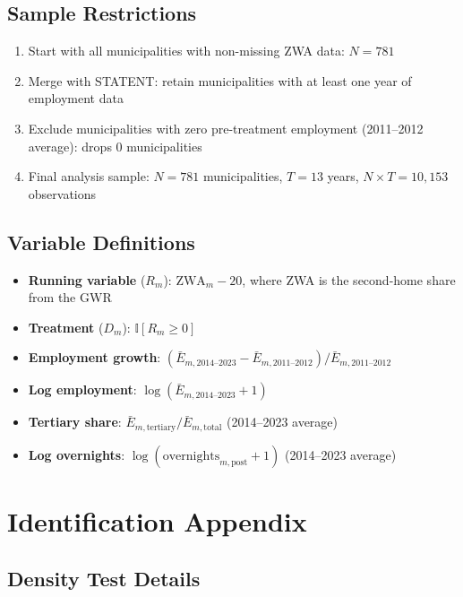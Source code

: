 \documentclass[12pt]{article}
\newcommand{\ind}{\mathbb{I}}
\begin{document}
\subsection{Sample Restrictions}

\begin{enumerate}
\item Start with all municipalities with non-missing ZWA data: $N = 781$
\item Merge with STATENT: retain municipalities with at least one year of employment data
\item Exclude municipalities with zero pre-treatment employment (2011--2012 average): drops 0 municipalities
\item Final analysis sample: $N = 781$ municipalities, $T = 13$ years, $N \times T = 10{,}153$ observations
\end{enumerate}

\subsection{Variable Definitions}

\begin{itemize}
\item \textbf{Running variable} ($R_m$): $\text{ZWA}_m - 20$, where ZWA is the second-home share from the GWR
\item \textbf{Treatment} ($D_m$): $\ind[R_m \geq 0]$
\item \textbf{Employment growth}: $(\bar{E}_{m,2014\text{--}2023} - \bar{E}_{m,2011\text{--}2012}) / \bar{E}_{m,2011\text{--}2012}$
\item \textbf{Log employment}: $\log(\bar{E}_{m,2014\text{--}2023} + 1)$
\item \textbf{Tertiary share}: $\bar{E}_{m,\text{tertiary}} / \bar{E}_{m,\text{total}}$ (2014--2023 average)
\item \textbf{Log overnights}: $\log(\text{overnights}_{m,\text{post}} + 1)$ (2014--2023 average)
\end{itemize}

\section{Identification Appendix}\label{app:identification}

\subsection{Density Test Details}
\end{document}
